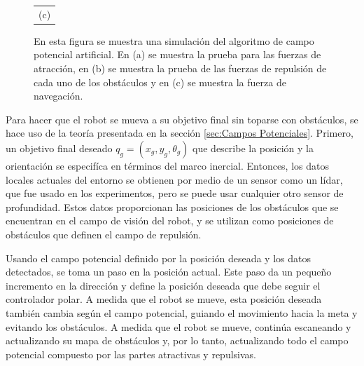 \begin{figure}
\begin{tabular}{cc}
    \multicolumn{2}{c}{(c)}
  \end{tabular}
  \captionsetup{font=footnotesize}
    \caption{\label{f:APF}En esta figura se muestra una simulación del algoritmo de campo potencial 
    artificial. En (a) se muestra la prueba para las fuerzas de atracción, en (b) se muestra la
    prueba de las fuerzas de repulsión de cada uno de los obstáculos y en (c) se muestra la fuerza
    de navegación.}
\end{figure}
Para hacer que el robot se mueva a su objetivo final sin toparse con obstáculos, se 
hace uso de la teoría presentada en la sección \ref{sec:Campos Potenciales}. Primero, un 
objetivo final deseado $q_{g} =(x_{g}, y_{g}, \theta_{g})$ que describe la posición y la 
orientación se especifíca en términos del marco inercial. Entonces, los datos locales 
actuales del entorno se obtienen por medio de un sensor como un lídar, que fue usado en 
los experimentos, pero se puede usar cualquier otro sensor de profundidad. Estos datos 
proporcionan las posiciones de los obstáculos que se encuentran en el campo de visión del 
robot, y se utilizan como posiciones de obstáculos que definen el campo de repulsión. 

Usando el campo potencial definido por la posición deseada y los datos detectados, se toma un 
paso en la posición actual. Este paso da un pequeño incremento en la dirección y define la 
posición deseada que debe seguir el controlador polar. A medida que el robot se mueve, esta 
posición deseada también cambia según el campo potencial, guiando el movimiento hacia la meta 
y evitando los obstáculos. A medida que el robot se mueve, continúa escaneando y actualizando 
su mapa de obstáculos y, por lo tanto, actualizando todo el campo potencial compuesto por las 
partes atractivas y repulsivas.

